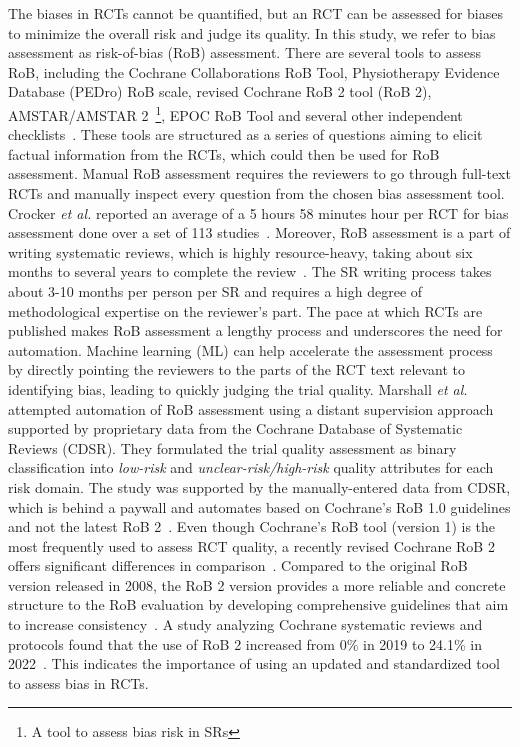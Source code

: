 \documentclass[sn-mathphys,Numbered]{sn-jnl}%
\theoremstyle{thmstyleone}%
\theoremstyle{thmstyletwo}%
\theoremstyle{thmstylethree}%
\begin{document}
The biases in RCTs cannot be quantified, but an RCT can be assessed for biases to minimize the overall risk and judge its quality.
In this study, we refer to bias assessment as risk-of-bias (RoB) assessment.
There are several tools to assess RoB, including the Cochrane Collaborations RoB Tool, Physiotherapy Evidence Database (PEDro) RoB scale, revised Cochrane RoB 2 tool (RoB 2), AMSTAR/AMSTAR 2~\footnote{A tool to assess bias risk in SRs}, EPOC RoB Tool and several other independent checklists~\cite{higgins2019,higgins2011cochrane,elkins2013growth,sterne2019rob,shea2017amstar,farrah2019risk}.
These tools are structured as a series of questions aiming to elicit factual information from the RCTs, which could then be used for RoB assessment.
Manual RoB assessment requires the reviewers to go through full-text RCTs and manually inspect every question from the chosen bias assessment tool.
Crocker \textit{et al.} reported an average of a 5 hours 58 minutes hour per RCT for bias assessment done over a set of 113 studies~\cite{crocker2023risk}. 
Moreover, RoB assessment is a part of writing systematic reviews, which is highly resource-heavy, taking about six months to several years to complete the review~\cite{tsertsvadze2015conduct,khangura2012evidence,higgins2019cochrane}.
The SR writing process takes about 3-10 months per person per SR and requires a high degree of methodological expertise on the reviewer's part.
The pace at which RCTs are published makes RoB assessment a lengthy process and underscores the need for automation.
Machine learning (ML) can help accelerate the assessment process by directly pointing the reviewers to the parts of the RCT text relevant to identifying bias, leading to quickly judging the trial quality.
Marshall \textit{et al.}~\cite{marshall2015automating} attempted automation of RoB assessment using a distant supervision approach supported by proprietary data from the Cochrane Database of Systematic Reviews (CDSR). 
They formulated the trial quality assessment as binary classification into \textit{low-risk} and \textit{unclear-risk/high-risk} quality attributes for each risk domain.
The study was supported by the manually-entered data from CDSR, which is behind a paywall and automates based on Cochrane's RoB 1.0 guidelines and not the latest RoB 2~\cite{higgins2011cochrane}.
Even though Cochrane's RoB tool (version 1) is the most frequently used to assess RCT quality, a recently revised Cochrane RoB 2 offers significant differences in comparison~\cite{ma2020methodological}.
Compared to the original RoB version released in 2008, the RoB 2 version provides a more reliable and concrete structure to the RoB evaluation by developing comprehensive guidelines that aim to increase consistency~\cite{higgins2011cochrane,sterne2019rob}.
A study analyzing Cochrane systematic reviews and protocols found that the use of RoB 2 increased from 0\% in 2019 to 24.1\% in 2022~\cite{martimbianco2023most}.
This indicates the importance of using an updated and standardized tool to assess bias in RCTs.
\end{document}
